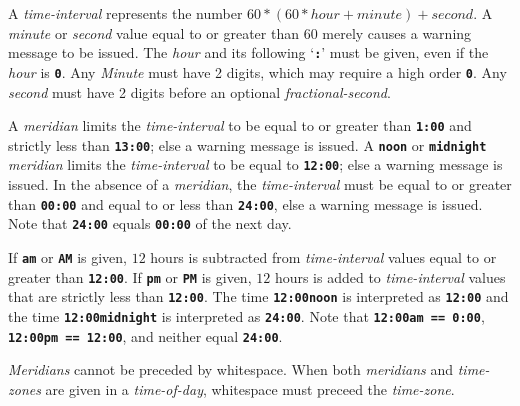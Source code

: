 \documentclass[12pt]{article}
\newcommand{\TT}[1]{{\tt \bfseries #1}}
\begin{document}
A {\em time-interval} represents the number
$60*(60*hour+minute)+second$.  A {\em minute} or
{\em second} value equal to or greater than $60$ merely causes a warning
message to be issued.  The {\em hour} and its following `\TT{:}'
must be given, even if the {\em hour} is \TT{0}.  Any {\em Minute}
must have 2 digits, which may require a high order \TT{0}.  
Any {\em second} must have 2 digits before an optional {\em fractional-second}.

A {\em meridian} limits the {\em time-interval}
to be equal to or greater than \TT{1:00} and strictly less than
\TT{13:00}; else a warning message is issued.  A \TT{noon}
or \TT{midnight} {\em meridian} limits the {\em time-interval}
to be equal to \TT{12:00}; else a warning message is issued.
In the absence of a {\em meridian}, the {\em time-interval}
must be equal to or greater than \TT{00:00} and equal to or less
than \TT{24:00}, else a warning message is issued.
Note that \TT{24:00} equals \TT{00:00} of the next day.

If \TT{am} or \TT{AM} is given, $12$ hours is subtracted from
{\em time-interval} values equal to or greater than \TT{12:00}.
If \TT{pm} or \TT{PM} is given, $12$ hours is added to
{\em time-interval} values that are strictly less than \TT{12:00}.
The time \TT{12:00noon} is interpreted as \TT{12:00} and
the time \TT{12:00midnight} is interpreted as \TT{24:00}.
Note that \TT{12:00am == 0:00}, \TT{12:00pm == 12:00}, and neither
equal \TT{24:00}.

{\em Meridians} cannot be preceded by whitespace.
When both {\em meridians} and {\em time-zones} are given
in a {\em time-of-day}, whitespace must preceed the {\em time-zone}.
\end{document}
